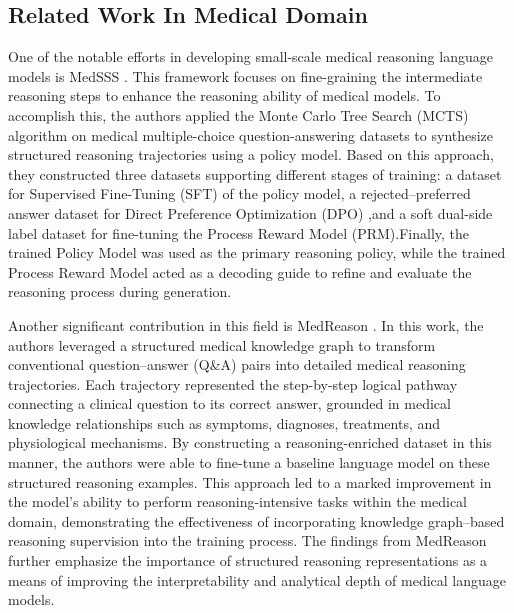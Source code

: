 \documentclass[conference]{IEEEtran}
\begin{document}
	\subsection{Related Work In Medical Domain}
One of the notable efforts in developing small-scale medical reasoning language models is MedSSS
\cite{b10}.
This framework focuses on fine-graining the intermediate reasoning steps to enhance the reasoning ability of medical models. To accomplish this, the authors applied the Monte Carlo Tree Search (MCTS)
\cite{b11}
algorithm on medical multiple-choice question-answering datasets to synthesize structured reasoning trajectories using a policy model. Based on this approach, they constructed three datasets supporting different stages of training: a dataset for Supervised Fine-Tuning (SFT) of the policy model, a rejected–preferred answer dataset for Direct Preference Optimization (DPO)
\cite{b12}
,and a soft dual-side label dataset for fine-tuning the Process Reward Model (PRM).Finally, the trained Policy Model was used as the primary reasoning policy, while the trained Process Reward Model acted as a decoding guide to refine and evaluate the reasoning process during generation.

Another significant contribution in this field is MedReason
\cite{b13}. 
In this work, the authors leveraged a structured medical knowledge graph to transform conventional question–answer (Q\&A) pairs into detailed medical reasoning trajectories. Each trajectory represented the step-by-step logical pathway connecting a clinical question to its correct answer, grounded in medical knowledge relationships such as symptoms, diagnoses, treatments, and physiological mechanisms. By constructing a reasoning-enriched dataset in this manner, the authors were able to fine-tune a baseline language model on these structured reasoning examples. This approach led to a marked improvement in the model’s ability to perform reasoning-intensive tasks within the medical domain, demonstrating the effectiveness of incorporating knowledge graph–based reasoning supervision into the training process. The findings from MedReason further emphasize the importance of structured reasoning representations as a means of improving the interpretability and analytical depth of medical language models.
\end{document}

